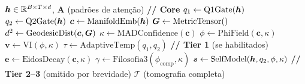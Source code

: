 \begin{algorithm}[H]
\caption{Forward do EpistemicHead}
\label{alg:epistemic_forward}
\begin{algorithmic}[1]
\REQUIRE $\bm{h} \in \mathbb{R}^{B \times T \times d}$, $\bm{A}$ (padr\~oes de aten\c{c}\~ao)
\STATE \textbf{// Core}
\STATE $q_1 \leftarrow \text{Q1Gate}(\bm{h})$
\STATE $q_2 \leftarrow \text{Q2Gate}(\bm{h})$
\STATE $\bm{c} \leftarrow \text{ManifoldEmb}(\bm{h})$ 
\STATE $\bm{G} \leftarrow \text{MetricTensor}()$ 
\STATE $d^2 \leftarrow \text{GeodesicDist}(\bm{c}, \bm{G})$ 
\STATE $\kappa \leftarrow \text{MADConfidence}(\bm{c})$ 
\STATE $\phi \leftarrow \text{PhiField}(\bm{c}, \kappa)$ 
\STATE $\bm{v} \leftarrow \text{VI}(\phi, \kappa)$ 
\STATE $\tau \leftarrow \text{AdaptiveTemp}(q_1, q_2)$ 
\STATE \textbf{// Tier 1} (se habilitados)
\STATE $\bm{e} \leftarrow \text{EidosDecay}(\bm{c}, \kappa)$
\STATE $\gamma \leftarrow \text{Filosofia3}(\phi_{\text{comp}}, \kappa)$
\STATE $\bm{s} \leftarrow \text{SelfModel}(\bm{h}, q_2, \phi, \kappa)$
\STATE \textbf{// Tier 2--3} (omitido por brevidade)
\RETURN $\mathcal{T}$ (tomografia completa)
\end{algorithmic}
\end{algorithm}

